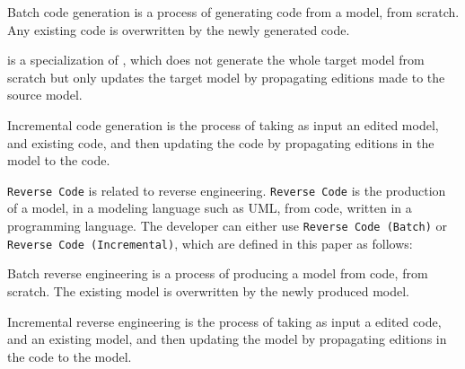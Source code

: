 \begin{definition}
	Batch code generation is a process of generating code
	from a model, from scratch.
	Any existing code is overwritten by the newly generated code.
\end{definition}

 is a specialization of , which
does not generate the whole target model from scratch but only updates the target model by
propagating editions made to the source model.



\begin{definition}
	Incremental code generation is the process
	of taking as input an edited model, and existing code, and then updating the code by propagating
	editions in the model to the code.
\end{definition}

\texttt{Reverse Code} is related to reverse engineering.
\texttt{Reverse Code} is the production of a model, in a modeling language such as UML, from code, written in a programming language.
The developer can either use \texttt{Reverse Code (Batch)} or \texttt{Reverse Code (Incremental)}, which are defined in this paper as follows:

\begin{definition}
	Batch reverse engineering is a process of producing a model from code, from scratch.
	The existing model is overwritten by the newly produced model.
\end{definition}

\begin{definition}
	Incremental reverse engineering is the process of taking as
	input a edited code, and an existing model, and then updating the model by propagating
	editions in the code to the model.
\end{definition}

